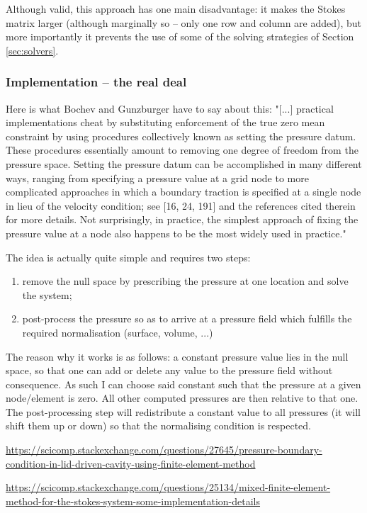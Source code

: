 Although valid, this approach has one main disadvantage: it makes the Stokes matrix larger (although
marginally so -- only one row and column are added), but more importantly it prevents the use of some
of the solving strategies of Section \ref{sec:solvers}.


\subsubsection{Implementation -- the real deal}

Here is what Bochev and Gunzburger \cite[Section 7.6.4]{bogu09} have to say about this:
"[...] practical implementations cheat by substituting enforcement of the true zero mean constraint by using
procedures collectively known as setting the pressure datum. These procedures essentially 
amount to removing one degree of freedom from the pressure space.
Setting the pressure datum can be accomplished in many different ways, ranging
from specifying a pressure value at a grid node to more complicated approaches in
which a boundary traction is specified at a single node in lieu of the velocity condition; 
see [16, 24, 191] and the references cited therein for more details. Not surprisingly, 
in practice, the simplest approach of fixing the pressure value at a node also
happens to be the most widely used in practice."




The idea is actually quite simple and requires two steps:
\begin{enumerate}
\item remove the null space by prescribing the pressure at one location and solve the system;
\item post-process the pressure so as to arrive at a pressure field which fulfills the required normalisation (surface, volume, ...)
\end{enumerate}

The reason why it works is as follows: a constant pressure value lies in the null space, so that one can 
add or delete any value to the pressure field without consequence. As such I can choose said constant such that 
the pressure at a given node/element is zero. All other computed pressures are then relative to that one. 
The post-processing step will redistribute a constant value to all pressures (it will shift them up or down)
so that the normalising condition is respected. 


\Literature

\url{https://scicomp.stackexchange.com/questions/27645/pressure-boundary-condition-in-lid-driven-cavity-using-finite-element-method}

\url{
https://scicomp.stackexchange.com/questions/25134/mixed-finite-element-method-for-the-stokes-system-some-implementation-details}





